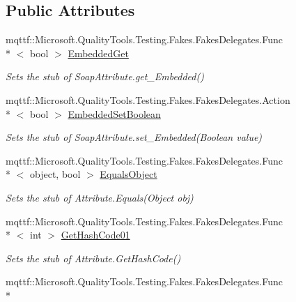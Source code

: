 \subsection*{Public Attributes}
\begin{DoxyCompactItemize}
\item 
mqttf\-::\-Microsoft.\-Quality\-Tools.\-Testing.\-Fakes.\-Fakes\-Delegates.\-Func\\*
$<$ bool $>$ \hyperlink{class_system_1_1_runtime_1_1_remoting_1_1_metadata_1_1_fakes_1_1_stub_soap_attribute_a4b7277d23b6d624c1d0f16150514110c}{Embedded\-Get}
\begin{DoxyCompactList}\small\item\em Sets the stub of Soap\-Attribute.\-get\-\_\-\-Embedded()\end{DoxyCompactList}\item 
mqttf\-::\-Microsoft.\-Quality\-Tools.\-Testing.\-Fakes.\-Fakes\-Delegates.\-Action\\*
$<$ bool $>$ \hyperlink{class_system_1_1_runtime_1_1_remoting_1_1_metadata_1_1_fakes_1_1_stub_soap_attribute_ab9b57f65f4d1b78a2f093881894bded6}{Embedded\-Set\-Boolean}
\begin{DoxyCompactList}\small\item\em Sets the stub of Soap\-Attribute.\-set\-\_\-\-Embedded(\-Boolean value)\end{DoxyCompactList}\item 
mqttf\-::\-Microsoft.\-Quality\-Tools.\-Testing.\-Fakes.\-Fakes\-Delegates.\-Func\\*
$<$ object, bool $>$ \hyperlink{class_system_1_1_runtime_1_1_remoting_1_1_metadata_1_1_fakes_1_1_stub_soap_attribute_a316fa3a3ee77ef70e4d79622d2855283}{Equals\-Object}
\begin{DoxyCompactList}\small\item\em Sets the stub of Attribute.\-Equals(\-Object obj)\end{DoxyCompactList}\item 
mqttf\-::\-Microsoft.\-Quality\-Tools.\-Testing.\-Fakes.\-Fakes\-Delegates.\-Func\\*
$<$ int $>$ \hyperlink{class_system_1_1_runtime_1_1_remoting_1_1_metadata_1_1_fakes_1_1_stub_soap_attribute_a0f4aef8787c6dee69063ea49327bfce8}{Get\-Hash\-Code01}
\begin{DoxyCompactList}\small\item\em Sets the stub of Attribute.\-Get\-Hash\-Code()\end{DoxyCompactList}\item 
mqttf\-::\-Microsoft.\-Quality\-Tools.\-Testing.\-Fakes.\-Fakes\-Delegates.\-Func\\*

\end{DoxyCompactItemize}
